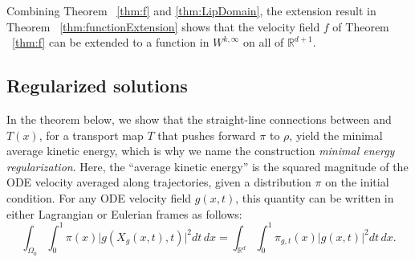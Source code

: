 Combining Theorem ~\ref{thm:f} and \ref{thm:LipDomain}, the extension result in  Theorem ~\ref{thm:functionExtension} shows that the velocity field $f$ of Theorem ~\ref{thm:f} can be extended to a function in $W^{k, \infty}$ on all of $\mathbb{R}^{d+1}$. 
  







\subsection{Regularized solutions}\label{sec:optsols}

In the theorem below, we show that the straight-line connections
between  and $T(x)$, for a transport map $T$ that pushes
forward $\pi$ to $\rho$, yield the minimal average kinetic
energy, which is why we name the construction \textit{minimal energy regularization}. Here, the ``average kinetic energy'' is the squared magnitude of the ODE velocity averaged along trajectories, given a distribution $\pi$ on the initial condition. For any ODE velocity field $g(x,t)$, this quantity can be written in either Lagrangian or Eulerian frames as follows:
$$
\int_{\Omega_0} \int_0^1 \pi(x) \vert g(X_g(x,t),t) \vert^2 dt \, dx = \int_{\mathbb{R}^d} \int_0^1 \pi_{g,t}(x) \vert  g(x,t) \vert^2 dt \, dx. 
$$


